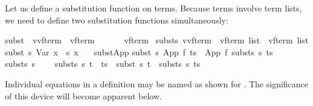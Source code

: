 \begin{isabellebody}
\begin{isamarkuptext}
Let us define a substitution function on terms. Because terms involve term
lists, we need to define two substitution functions simultaneously:%
\end{isamarkuptext}%
\isamarkuptrue%
\isamarkupfalse%
\isanewline
subst\ {\isacharcolon}{\isacharcolon}\ {\isachardoublequoteopen}{\isacharparenleft}{\isacharprime}v{\isasymRightarrow}{\isacharparenleft}{\isacharprime}v{\isacharcomma}{\isacharprime}f{\isacharparenright}term{\isacharparenright}\ {\isasymRightarrow}\ {\isacharparenleft}{\isacharprime}v{\isacharcomma}{\isacharprime}f{\isacharparenright}term\ \ \ \ \ \ {\isasymRightarrow}\ {\isacharparenleft}{\isacharprime}v{\isacharcomma}{\isacharprime}f{\isacharparenright}term{\isachardoublequoteclose}\ \isanewline
substs{\isacharcolon}{\isacharcolon}\ {\isachardoublequoteopen}{\isacharparenleft}{\isacharprime}v{\isasymRightarrow}{\isacharparenleft}{\isacharprime}v{\isacharcomma}{\isacharprime}f{\isacharparenright}term{\isacharparenright}\ {\isasymRightarrow}\ {\isacharparenleft}{\isacharprime}v{\isacharcomma}{\isacharprime}f{\isacharparenright}term\ list\ {\isasymRightarrow}\ {\isacharparenleft}{\isacharprime}v{\isacharcomma}{\isacharprime}f{\isacharparenright}term\ list{\isachardoublequoteclose}\isanewline
{}\isanewline
{\isachardoublequoteopen}subst\ s\ {\isacharparenleft}Var\ x{\isacharparenright}\ {\isacharequal}\ s\ x{\isachardoublequoteclose}\ {\isacharbar}\isanewline
\ \ subst{\isacharunderscore}App{\isacharcolon}\isanewline
{\isachardoublequoteopen}subst\ s\ {\isacharparenleft}App\ f\ ts{\isacharparenright}\ {\isacharequal}\ App\ f\ {\isacharparenleft}substs\ s\ ts{\isacharparenright}{\isachardoublequoteclose}\ {\isacharbar}\isanewline
\isanewline
{\isachardoublequoteopen}substs\ s\ {\isacharbrackleft}{\isacharbrackright}\ {\isacharequal}\ {\isacharbrackleft}{\isacharbrackright}{\isachardoublequoteclose}\ {\isacharbar}\isanewline
{\isachardoublequoteopen}substs\ s\ {\isacharparenleft}t\ {\isacharhash}\ ts{\isacharparenright}\ {\isacharequal}\ subst\ s\ t\ {\isacharhash}\ substs\ s\ ts{\isachardoublequoteclose}%
\begin{isamarkuptext}%
\noindent
Individual equations in a  definition may be
named as shown for .
The significance of this device will become apparent below.


\end{isamarkuptext}
\end{isabellebody}
